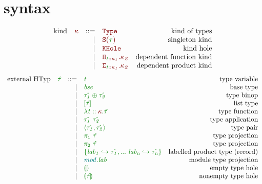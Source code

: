 \documentclass[12pt,fleqn]{article}
\newcommand{\red}[1]{\textcolor{red}{#1}}
\newcommand{\green}[1]{\textcolor{green}{#1}}
\newcommand{\teal}[1]{\textcolor{teal}{#1}}
\newcommand{\redtt}[1]{\red{\mathtt{#1}}}
\newcommand{\greentt}[1]{\green{\mathtt{#1}}}
\newcommand{\redit}[1]{\red{\mathit{#1}}}
\newcommand{\greenit}[1]{\green{\mathit{#1}}}
\newcommand{\tealit}[1]{\teal{\mathit{#1}}}
\newcommand{\knd}[1][]{\redit{\kappa#1}}
\newcommand{\utyp}[1][]{\greenit{\hat{\tau#1}}}
\newcommand{\typ}[1][]{\greenit{\tau#1}}
\newcommand{\utypvar}[1][]{\greenit{t#1}}
\newcommand{\typvar}[1][]{\greenit{t#1}}
\renewcommand{\mod}[1][]{\tealit{mod#1}}
\newcommand{\lab}[1][]{\mathit{lab#1}}
\newcommand{\Type}{\redtt{Type}}
\newcommand{\SKind}[1]{\redtt{S(#1)}}
\newcommand{\KHole}{\redtt{KHole}}
\newcommand{\DepFunKind}[2]{\redtt{\Pi_{#1}.{#2}}}
\newcommand{\DepProdKind}[2]{\redtt{\Sigma_{#1}.{#2}}}
\newcommand{\TypCFun}[2]{\greentt{\lambda #1.#2}}
\newcommand{\TypCAp}[2]{\greentt{#1~#2}}
\newcommand{\TypCPair}[2]{\greentt{\langle #1, #2\rangle}}
\newcommand{\TypCPairPrjL}[1]{\greentt{\pi_1~#1}}
\newcommand{\TypCPairPrjR}[1]{\greentt{\pi_2~#1}}
\newcommand{\ListTyp}[1]{\greentt{[#1]}}
\newcommand{\TypCHole}[1][]{\greentt{\llparenthesis #1 \rrparenthesis}}
\begin{document}
\section{syntax}
\[\begin{array}{rcrlr}
    \textrm{kind} & \knd & ::=
                  & \Type & \textrm{kind of types} \\
                  && \vert & \SKind{\typ} & \textrm{singleton kind} \\
                  && \vert & \KHole & \textrm{kind hole} \\
                  && \vert & \DepFunKind{\typvar::\knd[_1]}{\knd[_2]} & \textrm{dependent function kind} \\
                  && \vert & \DepProdKind{\typvar::\knd[_1]}{\knd[_2]} & \textrm{dependent product kind} \\
\end{array}\]
\[\begin{array}{rcrlr}
    \textrm{external HTyp} & \utyp & ::=
                           & \utypvar & \textrm{type variable} \\
                           && \vert & \greenit{bse} & \textrm{base type} \\
                           && \vert & \greentt{\utyp[_1] \oplus \utyp[_2]} & \textrm{type binop} \\
                           && \vert & \ListTyp{\utyp} & \textrm{list type} \\
                           && \vert & \TypCFun{\typvar::\knd}{\utyp} & \textrm{type function} \\
                           && \vert & \TypCAp{\utyp[_1]}{\utyp[_2]} & \textrm{type application} \\
                           && \vert & \TypCPair{\utyp[_1]}{\utyp[_2]} & \textrm{type pair} \\
                           && \vert & \TypCPairPrjL{\utyp} & \textrm{type projection} \\
                           && \vert & \TypCPairPrjR{\utyp} & \textrm{type projection} \\
                           && \vert & \greentt{\{\lab[_1] \hookrightarrow \utyp[_1], ...~\lab[_n] \hookrightarrow \utyp[_n]\}} & \textrm{labelled product type (record)} \\
                           && \vert & \greentt{\mod.\lab} & \textrm{module type projection} \\
                           && \vert & \TypCHole & \textrm{empty type hole} \\
                           && \vert & \TypCHole[\utyp] & \textrm{nonempty type hole} \\
\end{array}\]
\end{document}
